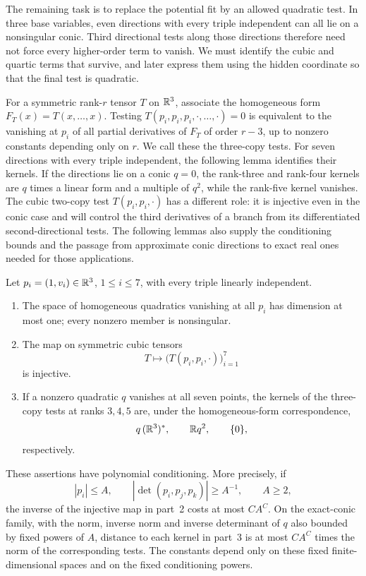The remaining task is to replace the potential fit by an allowed
quadratic test. In three base variables, even directions with every
triple independent can all lie on a nonsingular conic. Third
directional tests along those directions therefore need not force
every higher-order term to vanish. We must identify the cubic and
quartic terms that survive, and later express them using the hidden
coordinate so that the final test is quadratic.

For a symmetric rank-\(r\) tensor \(T\) on \(\mathbb R^3\), associate the
homogeneous form \(F_T(x)=T(x,\ldots,x)\).
Testing \(T(p_i,p_i,p_i,\cdot,\ldots,\cdot)=0\) is equivalent to
the vanishing at \(p_i\) of all partial derivatives of \(F_T\)
of order \(r-3\), up to nonzero constants depending only on \(r\).
We call these the three-copy tests. For seven directions with
every triple independent, the following lemma identifies their
kernels. If the directions lie on a conic \(q=0\), the rank-three
and rank-four kernels are \(q\) times a linear form and a multiple
of \(q^2\), while the rank-five kernel vanishes.
The cubic two-copy test \(T(p_i,p_i,\cdot)\) has a
different role: it is injective even in the conic case and will
control the third derivatives of a branch from its differentiated
second-directional tests. The following lemmas also supply the
conditioning bounds and the passage from approximate conic
directions to exact real ones needed for those applications.

\begin{lemma}\label{lem:tensor-kernels}
Let \(p_i=(1,v_i)\in\mathbb R^3\), \(1\leq i\leq7\), with every triple
linearly independent.
\begin{enumerate}
\item The space of homogeneous quadratics vanishing at all \(p_i\)
has dimension at most one; every nonzero member is nonsingular.
\item The map on symmetric cubic tensors
\[
 T\longmapsto\bigl(T(p_i,p_i,\cdot)\bigr)_{i=1}^7
\]
is injective.
\item If a nonzero quadratic \(q\) vanishes at all seven points,
the kernels of the three-copy tests at ranks \(3,4,5\) are,
under the homogeneous-form correspondence,
\[
 q\,(\mathbb R^3)^*,\qquad \mathbb R q^2,\qquad \{0\},
\]
respectively.
\end{enumerate}
These assertions have polynomial conditioning. More precisely, if
\[
 |p_i|\leq A,\qquad
 |\det(p_i,p_j,p_k)|\geq A^{-1},\qquad A\geq2,
\]
the inverse of the injective map in part~2 costs at most \(CA^C\).
On the exact-conic family, with the norm, inverse norm and inverse
determinant of \(q\) also bounded by fixed powers of \(A\),
distance to each kernel in part~3 is at most \(CA^C\) times
the norm of the corresponding tests. The constants depend only
on these fixed finite-dimensional spaces and on the fixed
conditioning powers.
\end{lemma}

